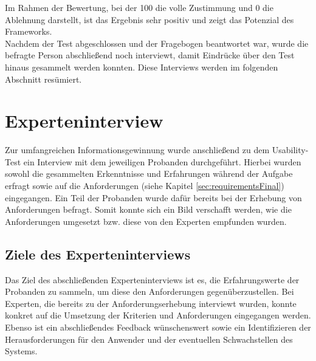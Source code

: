         Im Rahmen der Bewertung, bei der 100 die volle Zustimmung und 0 die Ablehnung darstellt, ist das Ergebnis 
        sehr positiv und zeigt das Potenzial des Frameworks. 
        \\
        Nachdem der Test abgeschlossen und der Fragebogen beantwortet war, wurde die befragte Person abschließend noch interviewt, damit 
        Eindrücke über den Test hinaus gesammelt werden konnten. Diese Interviews werden im folgenden Abschnitt resümiert. 

\section{Experteninterview}
        Zur umfangreichen Informationsgewinnung wurde anschließend zu dem Usability-Test ein Interview mit dem jeweiligen Probanden 
        durchgeführt. Hierbei wurden sowohl die gesammelten Erkenntnisse und Erfahrungen während der Aufgabe erfragt sowie auf die Anforderungen 
        (siehe Kapitel \ref{sec:requirementsFinal}) eingegangen. Ein Teil der Probanden wurde dafür bereits 
        bei der Erhebung von Anforderungen befragt. Somit konnte sich ein Bild verschafft werden, wie die Anforderungen 
        umgesetzt bzw. diese von den Experten empfunden wurden.
    
    \subsection{Ziele des Experteninterviews}
        Das Ziel des abschließenden Experteninterviews ist es, die Erfahrungswerte der Probanden zu sammeln, um diese den Anforderungen gegenüberzustellen. Bei 
        Experten, die bereits zu der Anforderungserhebung interviewt wurden, konnte konkret auf die Umsetzung der Kriterien und Anforderungen eingegangen werden. 
        Ebenso ist ein abschließendes Feedback wünschenswert sowie ein Identifizieren der Herausforderungen für den Anwender und der eventuellen Schwachstellen 
        des Systems. 

